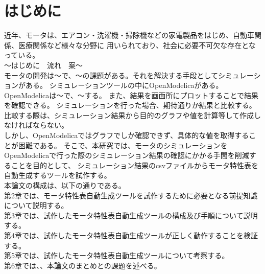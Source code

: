 \chapter{はじめに}\label{cha:Introduction}
近年、モータは、エアコン・洗濯機・掃除機などの家電製品をはじめ、自動車関係、医療関係など様々な分野に
用いられており\cite{モータ使用製品}、社会に必要不可欠な存在となっている。\\
～はじめに　流れ　案～\\
モータの開発は～で、～の課題がある。それを解決する手段としてシミュレーションがある。
シミュレーションツールの中にOpenModelicaがある。OpenModelicaは～で、～する。
また、結果を画面所にプロットすることで結果を確認できる。
シミュレーションを行った場合、期待通りか結果と比較する。\\
比較する際は、シミュレーション結果から目的のグラフや値を計算等して作成しなければならない。\\
しかし、OpenModelicaではグラフでしか確認できず、具体的な値を取得することが困難である。
そこで、本研究では、モータのシミュレーションをOpenModelicaで行った際のシミュレーション結果の確認にかかる手間を削減することを目的として、
シミュレーション結果のcsvファイルからモータ特性表を自動生成するツールを試作する。\\



本論文の構成は、以下の通りである。\\
第2章では、モータ特性表自動生成ツールを試作するために必要となる前提知識について説明する。\\
第3章では、試作したモータ特性表自動生成ツールの構成及び手順について説明する。\\
第4章では、試作したモータ特性表自動生成ツールが正しく動作することを検証する。\\
第5章では、試作したモータ特性表自動生成ツールについて考察する。\\
第6章では、、本論文のまとめとの課題を述べる。\\